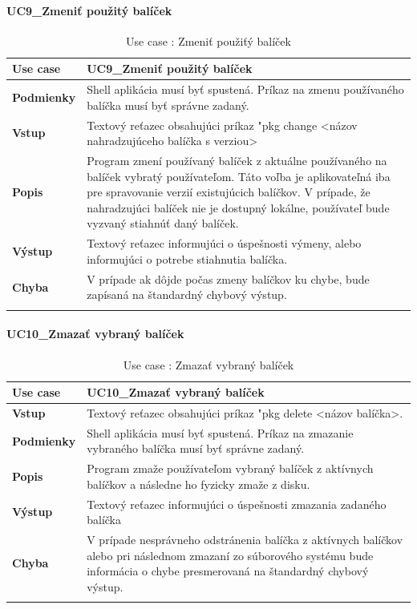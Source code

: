 \paragraph{UC9\_Zmeniť  použitý balíček}
\begin{center}
	\begin{longtable}{|p{2.5cm}|p{12.2cm}|}
		
			\hline
			\textbf{Use case} & UC9\_Zmeniť  použitý balíček \\ 
			\hline
			\textbf{Podmienky} & Shell aplikácia musí byť spustená. Príkaz na zmenu používaného balíčka musí byť správne zadaný.\\ 
			\hline
			\textbf{Vstup} & Textový reťazec obsahujúci príkaz "pkg change  <názov nahradzujúceho balíčka s verziou>\\
			\hline
			\textbf{Popis} & Program zmení používaný balíček z aktuálne používaného na balíček vybratý používateľom. Táto voľba je aplikovateľná iba pre spravovanie verzií existujúcich balíčkov. V prípade, že nahradzujúci balíček nie je dostupný lokálne, používateľ bude vyzvaný stiahnúť daný balíček.\\ 
			\hline
			\textbf{Výstup} & Textový reťazec informujúci o úspešnosti výmeny, alebo informujúci o potrebe stiahnutia balíčka.\\
			\hline
			\textbf{Chyba} & V prípade ak dôjde počas zmeny balíčkov ku chybe, bude zapísaná na štandardný chybový výstup.\\
			\hline
		\caption{Use case : Zmeniť  použiťý balíček}
		\label{table:1}
		
	\end{longtable}
\end{center}

\paragraph{UC10\_Zmazať vybraný balíček}
\begin{center}
	\begin{longtable}{|p{2.5cm}|p{12.2cm}|}
		
			\hline
			\textbf{Use case} & UC10\_Zmazať vybraný balíček \\ 
			\hline
			\textbf{Vstup} & Textový reťazec obsahujúci príkaz "pkg delete <názov balíčka>.\\
			\hline
			\textbf{Podmienky} & Shell aplikácia musí byť spustená. Príkaz na zmazanie vybraného balíčka musí byť správne zadaný.\\ 
			\hline
			\textbf{Popis} & Program zmaže používateľom vybraný balíček z aktívnych balíčkov a následne ho fyzicky zmaže z disku. \\
			\hline

			\textbf{Výstup} & Textový reťazec informujúci o úspešnosti zmazania zadaného balíčka\\
			\hline
			\textbf{Chyba} & V prípade nesprávneho odstránenia balíčka z aktívnych balíčkov alebo pri následnom zmazaní zo súborového systému bude informácia o chybe presmerovaná na štandardný chybový výstup.\\
			\hline
		\caption{Use case : Zmazať vybraný balíček}
		\label{table:1}
		
	\end{longtable}
\end{center}
